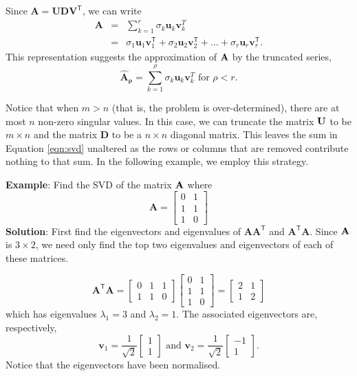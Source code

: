 Since $\mathbf{A} = \mathbf{UDV}^\mathsf{T}$, we can write
\begin{eqnarray}
\label{eqn:svd} \mathbf{A} & = &\sum_{k = 1}^r \sigma_k \mathbf u_k \mathbf v_k^T \\
\nonumber & = &\sigma_1\mathbf{u}_1\mathbf{v}_1^\mathsf{T}+ 
\sigma_2\mathbf{u}_2\mathbf{v}_2^\mathsf{T }+ \ldots + \sigma_r\mathbf{u}_r\mathbf{v}_r^\mathsf{T}.
\end{eqnarray}
This representation suggests the approximation of $\bf A$ by the truncated series, 
\[
 \mathbf{\widehat A_{\rho}}  = \sum_{k = 1}^{\rho} \sigma_k \mathbf u_k \mathbf v_k^T \mbox{ for } \rho < r.
\]

Notice that when $m > n$ (that is, the problem is over-determined), there are at most $n$ non-zero singular values.  In this case, we can truncate the matrix  $\bf U$ to be $m\times n$ and the matrix $\mathbf D$ to be a $n \times n$ diagonal matrix.  This leaves the sum in Equation \ref{eqn:svd} unaltered as the rows or columns that are removed contribute nothing to that sum. In the following example, we employ this strategy.

{\bf Example}: Find the SVD of the matrix $\bf A$ where 
\[ \mathbf{A}=\left[\begin{array}{rr}0&1\\1&1\\1&0\end{array}\right]
\]
{\bf Solution}:  First find the eigenvectors and eigenvalues of $\mathbf{A}\mathbf{A}^\mathsf{T}$ and $\mathbf{A}^\mathsf{T}\mathbf{A}$.  Since $\bf A$ is $3 \times 2$, we need only find the top two eigenvalues and eigenvectors of each of these matrices.  

\[ \mathbf{A}^\mathsf{T}\mathbf{A}=\left[\begin{array}{rrr}0&1&1\\1&1&0\end{array}\right]
\left[\begin{array}{rr}0&1\\1&1\\1&0\end{array}\right] = \left[\begin{array}{rr}2&1\\1&2\end{array}\right] 
\]
which  has eigenvalues $\lambda_1 = 3$ and $\lambda_2 = 1$.  The associated eigenvectors are, respectively, 
\[ \mathbf{v}_1=\frac{1}{\sqrt{2}}\left[\begin{array}{r}1\\ 1\end{array}\right] \mbox{ and } \mathbf{v}_2=\frac{1}{\sqrt{2}}\left[\begin{array}{r}-1\\ 1\end{array}\right].
\]
Notice that the eigenvectors have been normalised.

